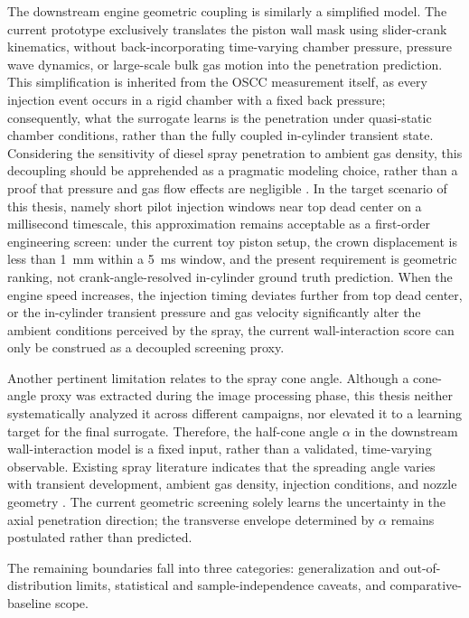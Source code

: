 The downstream engine geometric coupling is similarly a simplified model.
The current prototype exclusively translates the piston wall mask using slider-crank kinematics, without back-incorporating time-varying chamber pressure, pressure wave dynamics, or large-scale bulk gas motion into the penetration prediction.
This simplification is inherited from the OSCC measurement itself, as every injection event occurs in a rigid chamber with a fixed back pressure;
consequently, what the surrogate learns is the penetration under quasi-static chamber conditions, rather than the fully coupled in-cylinder transient state.
Considering the sensitivity of diesel spray penetration to ambient gas density, this decoupling should be apprehended as a pragmatic modeling choice, rather than a proof that pressure and gas flow effects are negligible \cite{NaberSiebers1996}.
In the target scenario of this thesis, namely short pilot injection windows near top dead center on a millisecond timescale, this approximation remains acceptable as a first-order engineering screen: under the current toy piston setup, the crown displacement is less than \SI{1}{mm} within a \SI{5}{ms} window, and the present requirement is geometric ranking, not crank-angle-resolved in-cylinder ground truth prediction.
When the engine speed increases, the injection timing deviates further from top dead center, or the in-cylinder transient pressure and gas velocity significantly alter the ambient conditions perceived by the spray, the current wall-interaction score can only be construed as a decoupled screening proxy.

Another pertinent limitation relates to the spray cone angle.
Although a cone-angle proxy was extracted during the image processing phase, this thesis neither systematically analyzed it across different campaigns, nor elevated it to a learning target for the final surrogate.
Therefore, the half-cone angle \(\alpha\) in the downstream wall-interaction model is a fixed input, rather than a validated, time-varying observable.
Existing spray literature indicates that the spreading angle varies with transient development, ambient gas density, injection conditions, and nozzle geometry \cite{NaberSiebers1996,JungManinSkeenPickett2015}.
The current geometric screening solely learns the uncertainty in the axial penetration direction; the transverse envelope determined by \(\alpha\) remains postulated rather than predicted.

The remaining boundaries fall into three categories: generalization and out-of-distribution limits, statistical and sample-independence caveats, and comparative-baseline scope.

